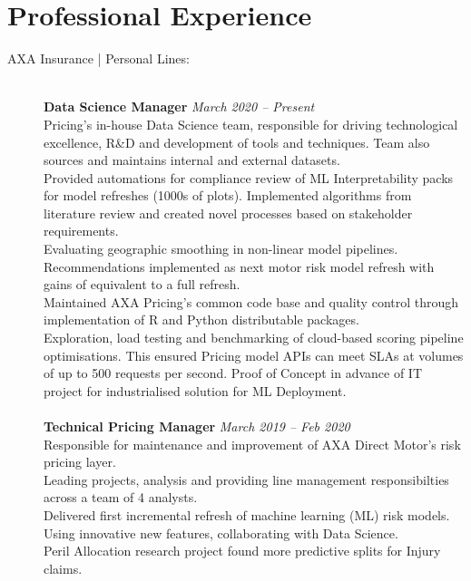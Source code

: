 \documentclass[11pt]{article}
\begin{document}
\section*{Professional Experience}
\begin{description}

\item[AXA Insurance | Personal Lines:] \hspace{1mm} \\
\textbf{Data Science Manager} \emph{March 2020 -- Present}\\
\textbullet \quad Pricing's in-house Data Science team, responsible for driving technological excellence, R\&D and development of tools and techniques. Team also sources and maintains internal and external datasets. \\
\textbullet \quad Provided automations for compliance review of ML Interpretability packs for model refreshes (1000s of plots). Implemented algorithms from literature review and created novel processes based on stakeholder requirements. \\
\textbullet \quad Evaluating geographic smoothing in non-linear model pipelines. Recommendations implemented as next motor risk model refresh with gains of equivalent to a full refresh.\\
\textbullet \quad Maintained AXA Pricing's common code base and quality control through implementation of R and Python distributable packages. \\
\textbullet \quad Exploration, load testing and benchmarking of cloud-based scoring pipeline optimisations. This ensured Pricing model APIs can meet SLAs at volumes of up to 500 requests per second. Proof of Concept in advance of IT project for industrialised solution for ML Deployment.
\\\\
\textbf{Technical Pricing Manager} \emph{March 2019 -- Feb 2020}\\
\textbullet \quad Responsible for maintenance and improvement of AXA Direct Motor's risk pricing layer.\\
\textbullet \quad Leading projects, analysis and providing line management responsibilties across a team of 4 analysts.\\
\textbullet \quad Delivered first incremental refresh of machine learning (ML) risk models. Using innovative new features, collaborating with Data Science.\\
\textbullet \quad Peril Allocation research project found more predictive splits for Injury claims.\\

\end{description}
\end{document}
